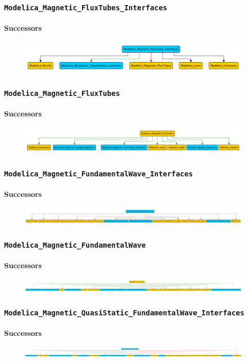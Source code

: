 \documentclass[aspectratio=1610]{beamer}
\begin{document}
\begin{frame}
  \frametitle{\texttt{Modelica\_Magnetic\_FluxTubes\_Interfaces}}
  \framesubtitle{Successors}
  \begin{figure}
      \includegraphics[width=\textwidth]{Modelica_Magnetic_FluxTubes_Interfaces}
  \end{figure}
\end{frame}

\begin{frame}
  \frametitle{\texttt{Modelica\_Magnetic\_FluxTubes}}
  \framesubtitle{Successors}
  \begin{figure}
      \includegraphics[width=\textwidth]{Modelica_Magnetic_FluxTubes}
  \end{figure}
\end{frame}

\begin{frame}
  \frametitle{\texttt{Modelica\_Magnetic\_FundamentalWave\_Interfaces}}
  \framesubtitle{Successors}
  \begin{figure}
      \includegraphics[width=\textwidth]{Modelica_Magnetic_FundamentalWave_Interfaces}
  \end{figure}
\end{frame}

\begin{frame}
  \frametitle{\texttt{Modelica\_Magnetic\_FundamentalWave}}
  \framesubtitle{Successors}
  \begin{figure}
      \includegraphics[width=\textwidth]{Modelica_Magnetic_FundamentalWave}
  \end{figure}
\end{frame}

\begin{frame}
  \frametitle{\texttt{Modelica\_Magnetic\_QuasiStatic\_FundamentalWave\_Interfaces}}
  \framesubtitle{Successors}
  \begin{figure}
      \includegraphics[width=\textwidth]{Modelica_Magnetic_QuasiStatic_FundamentalWave_Interfaces}
  \end{figure}
\end{frame}
\end{document}
